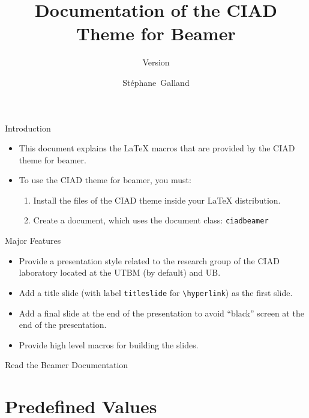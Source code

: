 \documentclass[english,sectioncirclenumberstyle]{ciadbeamer}
\title{Documentation of the CIAD Theme for Beamer}
\subtitle{Version \insertciadbeamerthemeversion}
\author[S.~Galland]{St\'ephane~Galland}
\begin{document}
\begin{frame}{Introduction}
	\begin{itemize}
	\item This document explains the {\LaTeX} macros that are provided by the CIAD theme for beamer.
	\vfill
	\item To use the CIAD theme for beamer, you must:
		\begin{enumerate}
		\item Install the files of the CIAD theme inside your {\LaTeX} distribution.
		\item Create a document, which uses the document class: \texttt{ciadbeamer}
		\end{enumerate}
	\end{itemize}
\end{frame}

\begin{frame}{Major Features}
	\begin{itemize}
	\item Provide a presentation style related to the research group of the CIAD laboratory located at the UTBM (by default) and UB.
	\vfill
	\item Add a title slide (with label \texttt{titleslide} for \texttt{{\textbackslash}hyperlink}) as the first slide.
	\vfill
	\item Add a final slide at the end of the presentation to avoid ``black'' screen at the end of the presentation.
	\vfill
	\item Provide high level macros for building the slides.
	\end{itemize}
\end{frame}

\begin{frame}{Read the Beamer Documentation}
	\huge
	\vspace{2em}
\end{frame}

\tableofcontentslide

\section{Predefined Values}
\tableofcontentslide[sectionstyle={show/shaded},subsectionstyle={show/show/hide},subsubsectionstyle={hide/hide/hide/hide}]
\end{document}

